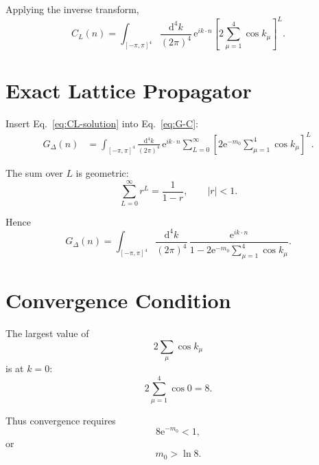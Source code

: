 \documentclass[11pt,a4paper,oneside]{article}
\newcommand{\ee}{\mathrm{e}}
\newcommand{\dd}{\mathrm{d}}
\begin{document}
	Applying the inverse transform,
	\begin{equation}
		\boxed{
			C_L(n)
			=
			\int_{[-\pi,\pi]^4}
			\frac{\dd^4k}{(2\pi)^4}
			\,
			\ee^{ik\cdot n}
			\left[
			2\sum_{\mu=1}^{4}\cos k_\mu
			\right]^L.
		}
		\label{eq:CL-solution}
	\end{equation}
	
	
	\section{Exact Lattice Propagator}
	
	Insert Eq.~\eqref{eq:CL-solution} into Eq.~\eqref{eq:G-C}:
	\begin{align}
		G_\Delta(n)
		&=
		\int_{[-\pi,\pi]^4}
		\frac{\dd^4k}{(2\pi)^4}
		\,
		\ee^{ik\cdot n}
		\sum_{L=0}^{\infty}
		\left[
		2\ee^{-m_0}
		\sum_{\mu=1}^{4}\cos k_\mu
		\right]^L.
	\end{align}
	
	The sum over $L$ is geometric:
	\begin{equation}
		\sum_{L=0}^{\infty}r^L
		=
		\frac{1}{1-r},
		\qquad
		|r|<1.
	\end{equation}
	
	Hence
	\begin{equation}
		\boxed{
			G_\Delta(n)
			=
			\int_{[-\pi,\pi]^4}
			\frac{\dd^4k}{(2\pi)^4}
			\,
			\frac{
				\ee^{ik\cdot n}
			}{
				1
				-
				2\ee^{-m_0}
				\displaystyle\sum_{\mu=1}^{4}\cos k_\mu
			}.
		}
		\label{eq:lattice-propagator}
	\end{equation}
	
	
	\section{Convergence Condition}
	
	The largest value of
	\[
	2\sum_\mu\cos k_\mu
	\]
	is at $k=0$:
	\begin{equation}
		2\sum_{\mu=1}^{4}\cos0=8.
	\end{equation}
	
	Thus convergence requires
	\begin{equation}
		8\ee^{-m_0}<1,
	\end{equation}
	or
	\begin{equation}
		\boxed{
			m_0>\ln8.
		}
		\label{eq:convergence}
	\end{equation}
	
\end{document}
